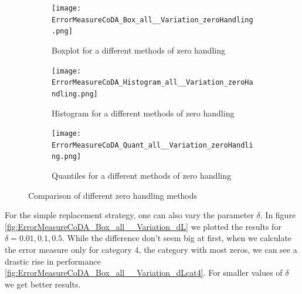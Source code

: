 \begin{figure}[htb!]
\centering
\begin{subfigure}[b]{0.45\textwidth}
\texttt{[image: ErrorMeasureCoDA\_Box\_all\_\_Variation\_zeroHandling.png]}
\caption{Boxplot for a different methods of zero handling}
\label{fig:Coda zero handling Box}
\end{subfigure}
\hfill
\begin{subfigure}[b]{0.45\textwidth}
\texttt{[image: ErrorMeasureCoDA\_Histogram\_all\_\_Variation\_zeroHandling.png]}
\caption{Histogram for a different methods of zero handling}
\label{fig:Coda zero handling Hist}
\end{subfigure}
\hfill
\begin{subfigure}[b]{0.8\textwidth}
\texttt{[image: ErrorMeasureCoDA\_Quant\_all\_\_Variation\_zeroHandling.png]}
\caption{Quantiles for a different methods of zero handling}
\label{fig:Coda zero handling Quant}
\end{subfigure}
\caption{Comparison of different zero handling methods}
\label{fig:Coda zero handling Comp1}
\end{figure}

For the simple replacement strategy, one can also vary the parameter $\delta$. In figure \ref{fig:ErrorMeasureCoDA_Box_all__Variation_dL} we plotted the results for $\delta=0.01,0.1,0.5$. While the difference don't seem big at first, when we calculate the error measure only for category 4, the category with most zeros, we can see a drastic rise in performance \ref{fig:ErrorMeasureCoDA_Box_all__Variation_dLcat4}. For smaller values of $\delta$ we get better results. 


